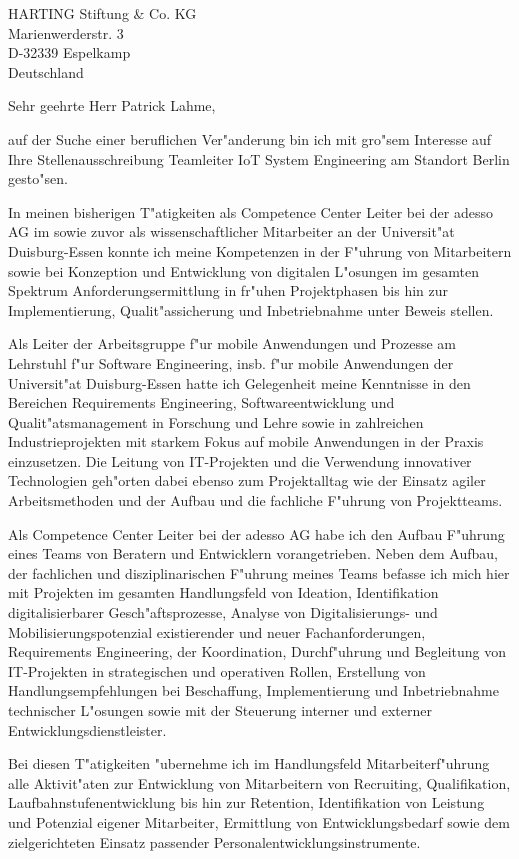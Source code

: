 \documentclass[10pt,a4paper]{dinbrief}
\date{\today}
\begin{document}
 
\begin{letter}  
{%
	HARTING Stiftung \& Co. KG\\
	Marienwerderstr. 3\\
	D-32339 Espelkamp\\
	Deutschland
}
\subject{\bf Bewerbung Teamleiter IoT System Engineering}
\opening{Sehr geehrte Herr Patrick Lahme,}
auf der Suche einer beruflichen Ver"anderung bin ich mit gro"sem Interesse auf Ihre Stellenausschreibung Teamleiter IoT System Engineering am Standort Berlin gesto"sen. 

In meinen bisherigen T"atigkeiten als Competence Center Leiter bei der adesso AG im sowie zuvor als wissenschaftlicher Mitarbeiter an der Universit"at Duisburg-Essen konnte ich meine Kompetenzen in der F"uhrung von Mitarbeitern sowie bei Konzeption und Entwicklung von digitalen L"osungen im gesamten Spektrum Anforderungsermittlung in fr"uhen Projektphasen bis hin zur Implementierung, Qualit"assicherung und Inbetriebnahme unter Beweis stellen.

Als Leiter der Arbeitsgruppe f"ur mobile Anwendungen und Prozesse am Lehrstuhl f"ur Software Engineering, insb. f"ur mobile Anwendungen der Universit"at Duisburg-Essen hatte ich Gelegenheit meine Kenntnisse in den Bereichen Requirements Engineering, Softwareentwicklung und Qualit"atsmanagement in Forschung und Lehre sowie in zahlreichen Industrieprojekten mit starkem Fokus auf mobile Anwendungen in der Praxis einzusetzen. Die Leitung von IT-Projekten und die Verwendung innovativer Technologien geh"orten dabei ebenso zum Projektalltag wie der Einsatz agiler Arbeitsmethoden und der Aufbau und die fachliche  F"uhrung von Projektteams.

Als Competence Center Leiter bei der adesso AG habe ich den Aufbau F"uhrung eines Teams von Beratern und Entwicklern vorangetrieben. Neben dem Aufbau, der fachlichen und disziplinarischen F"uhrung meines Teams befasse ich mich hier mit Projekten im gesamten Handlungsfeld von Ideation, Identifikation digitalisierbarer Gesch"aftsprozesse, Analyse von Digitalisierungs- und Mobilisierungspotenzial existierender und neuer Fachanforderungen, Requirements Engineering, der Koordination, Durchf"uhrung und Begleitung von IT-Projekten in strategischen und operativen Rollen, Erstellung von Handlungsempfehlungen bei Beschaffung, Implementierung und Inbetriebnahme technischer L"osungen sowie mit der Steuerung interner und externer Entwicklungsdienstleister. 

Bei diesen T"atigkeiten "ubernehme ich im Handlungsfeld Mitarbeiterf"uhrung alle Aktivit"aten zur Entwicklung von Mitarbeitern von Recruiting, Qualifikation, Laufbahnstufenentwicklung bis hin zur Retention, Identifikation von Leistung und Potenzial eigener Mitarbeiter, Ermittlung von Entwicklungsbedarf sowie dem zielgerichteten Einsatz passender Personalentwicklungsinstrumente.


\end{letter}
\end{document}
